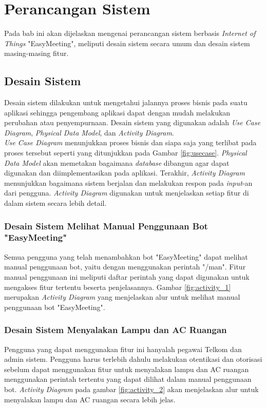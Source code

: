 \section{Perancangan Sistem}
\tab Pada bab ini akan dijelaskan mengenai perancangan sistem berbasis \textit{Internet of Things} "EasyMeeting", meliputi desain sistem secara umum dan desain sistem masing-masing fitur.

\subsection{Desain Sistem}
\tab Desain sistem dilakukan untuk mengetahui jalannya proses bisnis pada suatu aplikasi sehingga pengembang aplikasi dapat dengan mudah melakukan perubahan atau penyempurnaan. Desain sistem yang digunakan adalah \textit{Use Case Diagram}, \textit{Physical Data Model}, dan \textit{Activity Diagram}.\\
\tab \textit{Use Case Diagram} menunjukkan proses bisnis dan siapa saja yang terlibat pada proses tersebut seperti yang ditunjukkan pada Gambar \ref{fig:usecase}. \textit{Physical Data Model} akan memetakan bagaimana \textit{database} dibangun agar dapat digunakan dan diimplementasikan pada aplikasi. Terakhir, \textit{Activity Diagram} menunjukkan bagaimana sistem berjalan dan melakukan respon pada \textit{input}-an dari pengguna. \textit{Activity Diagram} digunakan untuk menjelaskan setiap fitur di dalam sistem secara lebih detail.

\subsubsection{Desain Sistem Melihat Manual Penggunaan Bot "EasyMeeting"}
\tab Semua pengguna yang telah menambahkan bot "EasyMeeting" dapat melihat manual penggunaan bot, yaitu dengan menggunakan perintah "/man". Fitur manual penggunaan ini meliputi daftar perintah yang dapat digunakan untuk mengakses fitur tertentu beserta penjelasannya. Gambar \ref{fig:activity_1} merupakan \textit{Activity Diagram} yang menjelaskan alur untuk melihat manual penggunaan bot "EasyMeeting".

\subsubsection{Desain Sistem Menyalakan Lampu dan AC Ruangan}
\tab Pengguna yang dapat menggunakan fitur ini hanyalah pegawai Telkom dan admin sistem. Pengguna harus terlebih dahulu melakukan otentikasi dan otorisasi sebelum dapat menggunakan fitur untuk menyalakan lampu dan AC ruangan menggunakan perintah tertentu yang dapat dilihat dalam manual penggunaan bot. \textit{Activity Diagram} pada gambar \ref{fig:activity_2} akan menjelaskan alur untuk menyalakan lampu dan AC ruangan secara lebih jelas.

